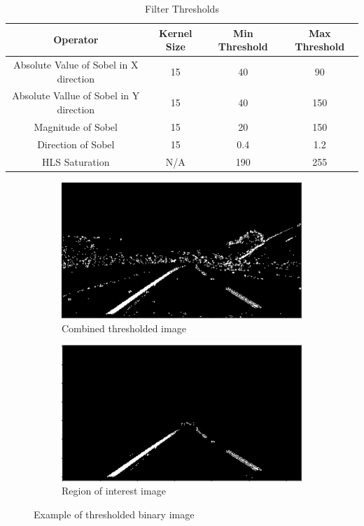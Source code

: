 \documentclass[12pt]{article}
\begin{document}
\begin{table}[ht]
\begin{tabular}{|c | c | c | c |}
\hline
\textbf{Operator} & \textbf{Kernel Size} & \textbf{Min Threshold} & \textbf{Max Threshold} \\ \hline
Absolute Value of Sobel in X direction & 15 & 40 & 90 \\ \hline
Absolute Vallue of Sobel in Y direction & 15 & 40 & 150 \\ \hline
Magnitude of Sobel & 15 & 20 & 150 \\ \hline
Direction of Sobel & 15 & 0.4 & 1.2 \\ \hline
HLS Saturation & N/A & 190 & 255 \\ \hline
\end{tabular}
\caption{Filter Thresholds}
\label{tab:threshold_table}
\end{table}

\begin{figure}[h]
\centering
\begin{subfigure}{.5\textwidth}
  \centering
  \includegraphics[width=1\linewidth]{thresholded_test.png}
  \caption{Combined thresholded image}
\end{subfigure}%
\begin{subfigure}{.5\textwidth}
  \centering
  \includegraphics[width=1\linewidth]{roi_test.png}
  \caption{Region of interest image}
\end{subfigure}
\caption{Example of thresholded binary image}
\label{fig:threshold_img}
\end{figure}
\end{document}
